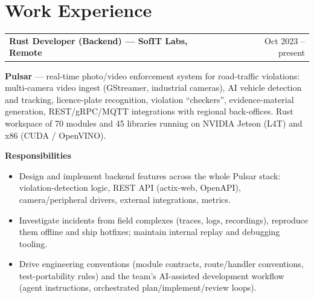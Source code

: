 \documentclass[a4paper,11pt]{article}
\makeatletter
\newenvironment{jobshort}[2]
    {
    \begin{tabularx}{\linewidth}{@{}l X r@{}}
    \textbf{#1} & \hfill &  #2 \\[3.75pt]
    \end{tabularx}
    }
    {
    }
\newcommand{\jobpart}[1]{\vspace{4pt}\textbf{#1}\vspace{1pt}}
\newenvironment{joblist}
    {\begin{itemize}[nosep, leftmargin=1em, itemsep=2pt, label=--]}
    {\end{itemize}}
\makeatother
\begin{document}
\section{Work Experience}

\begin{jobshort}{Rust Developer (Backend) --- SofIT Labs, Remote}{Oct 2023 -- present}
\textbf{Pulsar} --- real-time photo/video enforcement system for road-traffic violations: multi-camera video ingest (GStreamer, industrial cameras), AI vehicle detection and tracking, licence-plate recognition, violation ``checkers'', evidence-material generation, REST/gRPC/MQTT integrations with regional back-offices. Rust workspace of 70 modules and 45 libraries running on NVIDIA Jetson (L4T) and x86 (CUDA / OpenVINO).
\end{jobshort}

\jobpart{Responsibilities}
\begin{joblist}
\item Design and implement backend features across the whole Pulsar stack: violation-detection logic, REST API (actix-web, OpenAPI), camera/peripheral drivers, external integrations, metrics.
\item Investigate incidents from field complexes (traces, logs, recordings), reproduce them offline and ship hotfixes; maintain internal replay and debugging tooling.
\item Drive engineering conventions (module contracts, route/handler conventions, test-portability rules) and the team's AI-assisted development workflow (agent instructions, orchestrated plan/implement/review loops).
\end{joblist}
\end{document}
